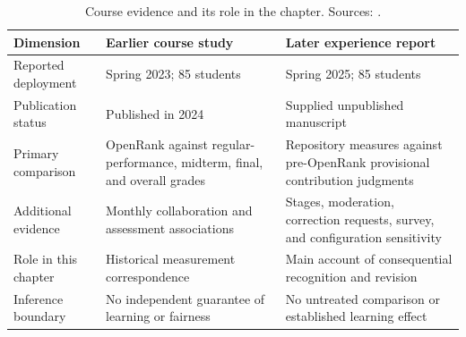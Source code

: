 \begin{table}[htbp]
\caption{Course evidence and its role in the chapter. Sources: \citet{wang2024course,seetmanuscript}.}
\label{tab:ch7-studies}
\small\renewcommand{\arraystretch}{1.2}
\begin{tabularx}{\linewidth}{@{}>{\raggedright\arraybackslash}p{28mm}>{\raggedright\arraybackslash}X>{\raggedright\arraybackslash}X@{}}\toprule
Dimension & Earlier course study & Later experience report\\\midrule
Reported deployment & Spring 2023; 85 students & Spring 2025; 85 students\\
Publication status & Published in 2024 & Supplied unpublished manuscript\\
Primary comparison & OpenRank against regular-performance, midterm, final, and overall grades & Repository measures against pre-OpenRank provisional contribution judgments\\
Additional evidence & Monthly collaboration and assessment associations & Stages, moderation, correction requests, survey, and configuration sensitivity\\
Role in this chapter & Historical measurement correspondence & Main account of consequential recognition and revision\\
Inference boundary & No independent guarantee of learning or fairness & No untreated comparison or established learning effect\\\bottomrule
\end{tabularx}
\end{table}
